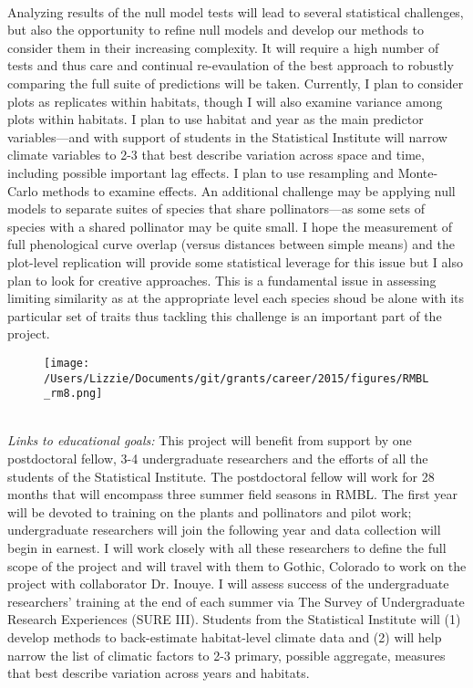 \documentclass[12pt,a4paper,oneside]{article}
\begin{document}
\vspace{1.5ex}\\
Analyzing results of the null model tests will lead to several statistical challenges, but also the opportunity to refine null models and develop our methods to consider them in their increasing complexity. It will require a high number of tests and thus care and continual re-evaulation of the best approach to robustly comparing the full suite of predictions will be taken. Currently, I plan to consider plots as replicates within habitats, though I will also examine variance among plots within habitats. I plan to use habitat and year as the main predictor variables---and with support of students in the Statistical Institute will narrow climate variables to 2-3 that best describe variation across space and time, including possible important lag effects. I plan to use resampling and Monte-Carlo methods to examine effects. An additional challenge may be applying null models to separate suites of species that share pollinators---as some sets of species with a shared pollinator may be quite small. I hope the measurement of full phenological curve overlap (versus distances between simple means) and the plot-level replication will provide some statistical leverage for this issue but I also plan to look for creative approaches. This is a fundamental issue in assessing limiting similarity as at the appropriate level each species shoud be alone with its particular set of traits thus tackling this challenge is an important part of the project.
\begin{figure}[h!]
\begin{center}
\texttt{[image: /Users/Lizzie/Documents/git/grants/career/2015/figures/RMBL\_rm8.png]}
\end{center}
\end{figure}
\vspace{1.5ex}\\
\emph {Links to educational goals:} This project will benefit from support by one postdoctoral fellow, 3-4 undergraduate researchers and the efforts of all the students of the Statistical Institute. The postdoctoral fellow will work for 28 months that will encompass three summer field seasons in RMBL. The first year will be devoted to training on the plants and pollinators and pilot work; undergraduate researchers will join the following year and data collection will begin in earnest. I will work closely with all these researchers to define the full scope of the project and will travel with them to Gothic, Colorado to work on the project with collaborator Dr. Inouye. I will assess success of the undergraduate researchers' training at the end of each summer via The Survey of Undergraduate Research Experiences (SURE III). Students from the Statistical Institute will (1) develop methods to back-estimate habitat-level climate data and (2) will help narrow the list of climatic factors to 2-3 primary, possible aggregate, measures that best describe variation across years and habitats.
\end{document}
